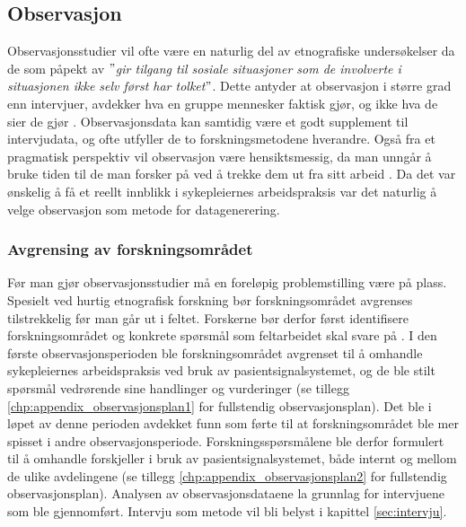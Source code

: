 \subsection{Observasjon}
\label{section:observasjon}
 
Observasjonsstudier vil ofte være en naturlig del av etnografiske undersøkelser da de som påpekt av \citet{Tjora} \textit{$"$gir tilgang til sosiale situasjoner som de involverte i situasjonen ikke selv først har tolket$"$}. Dette antyder at observasjon i større grad enn intervjuer, avdekker hva en gruppe mennesker faktisk gjør, og ikke hva de sier de gjør \citep{Oates, Blomberg93, Tjora}. Observasjonsdata kan samtidig være et godt supplement til intervjudata, og ofte utfyller de to forskningsmetodene hverandre. Også fra et pragmatisk perspektiv vil observasjon være hensiktsmessig, da man unngår å bruke tiden til de man forsker på ved å trekke dem ut fra sitt arbeid \citep{Tjora}. Da det var ønskelig å få et reellt innblikk i sykepleiernes arbeidspraksis var det naturlig å velge observasjon som metode for datagenerering.
 
\noindent
\subsubsection{Avgrensing av forskningsområdet}
Før man gjør observasjonsstudier må en foreløpig problemstilling være på plass. Spesielt ved hurtig etnografisk forskning bør forskningsområdet avgrenses tilstrekkelig før man går ut i feltet. Forskerne bør derfor først identifisere forskningsområdet og konkrete spørsmål som feltarbeidet skal svare på \citep{Tjora, Millen00}. I den første observasjonsperioden ble forskningsområdet avgrenset til å omhandle sykepleiernes arbeidspraksis ved bruk av pasientsignalsystemet, og de ble stilt spørsmål vedrørende sine handlinger og vurderinger (se tillegg \ref{chp:appendix_observasjonsplan1} for fullstendig observasjonsplan). Det ble i løpet av denne perioden avdekket funn som førte til at forskningsområdet ble mer spisset i andre observasjonsperiode. Forskningsspørsmålene ble derfor formulert til å omhandle forskjeller i bruk av pasientsignalsystemet, både internt og mellom de ulike avdelingene (se tillegg \ref{chp:appendix_observasjonsplan2} for fullstendig observasjonsplan). Analysen av observasjonsdataene la grunnlag for intervjuene som ble gjennomført. Intervju som metode vil bli belyst i kapittel \ref{sec:intervju}.

